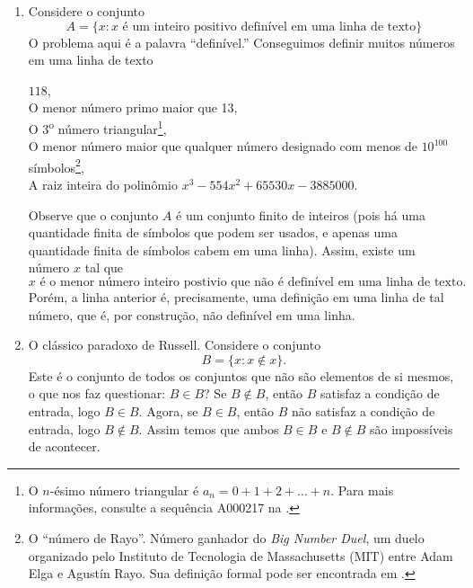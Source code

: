 \begin{enumerate}
    \item Considere o conjunto
          \[
              A = \{x: x \text{ é um inteiro positivo definível em uma linha de texto}\}
          \]
          O problema aqui é a palavra ``definível.''  Conseguimos definir muitos números em uma linha de texto
              {\small
                  \begin{center}
                      \(118\), \\
                      O menor número primo maior que 13, \\
                      O 3\textsuperscript{o} número triangular\footnote{O \(n\)-ésimo número triangular é \(a_n = 0 + 1 + 2 + \dots + n\). Para mais informações, consulte a sequência A000217 na \textcite{oeisA000217}.}, \\
                      O menor número maior que qualquer número designado com menos de  \(10^{100}\) símbolos\footnote{O ``número de Rayo''. Número ganhador do \emph{Big Number Duel}, um duelo organizado pelo Instituto de Tecnologia de Massachusetts (MIT) entre Adam Elga e Agustín Rayo. Sua definição formal pode ser encontrada em \textcite{rayo2007}.}, \\
                      A raiz inteira do polinômio \(x^3 - 554 x^2 + 65530 x - 3885000\).
                  \end{center}}

          Observe que o conjunto \(A\) é um conjunto finito de inteiros (pois há uma quantidade finita de símbolos que podem ser usados, e apenas uma quantidade finita de símbolos cabem em uma linha). Assim, existe um número \(x\) tal que
          \[x \text{ é o menor número inteiro postivio que não é definível em uma linha de texto.}\]
          Porém, a linha anterior é, precisamente, uma definição em uma linha de tal número, que é, por construção, não definível em uma linha.

    \item O clássico paradoxo de Russell. Considere o conjunto
          \[B = \{x: x \notin x\}.\]
          Este é o conjunto de todos os conjuntos que não são elementos de si mesmos, o que nos faz questionar: \(B \in B\)? Se \(B \notin B\), então \(B\) satisfaz a condição de entrada, logo \(B \in B\). Agora, se \(B \in B\), então \(B\) não satisfaz a condição de entrada, logo \(B \notin B\). Assim temos que ambos \(B \in B\) e \(B \notin B\) são impossíveis de acontecer.
\end{enumerate}


